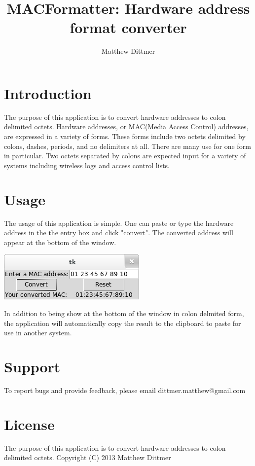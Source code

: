 \documentclass[10pt,a4paper]{article}
\author{Matthew Dittmer}
\title{MACFormatter: Hardware address format converter}
\begin{document}
\maketitle
\section*{Introduction}

The purpose of this application is to convert hardware
 addresses to colon delimited octets.  Hardware addresses, 
 or MAC(Media Access Control) addresses, are expressed in a 
 variety of forms.  These forms include two octets 
 delimited by colons, dashes, periods, and no delimiters at 
 all.  There are many use for one form in particular.  Two 
 octets separated by colons are expected input for a 
 variety of systems including wireless logs and access 
 control lists.

\section*{Usage}

The usage of this application is simple.  One can paste or 
type the hardware address in the the entry box and click 
"convert".  The converted address will appear at the bottom 
of the window.

\includegraphics[scale=.5]{screenshot0.png}

In addition to being show at the bottom of the window in 
colon delmited form, the application will automatically 
copy the result to the clipboard to paste for use in 
another system.

\section*{Support}

To report bugs and provide feedback, please email 
dittmer.matthew@gmail.com

\section*{License}

The purpose of this application is to convert hardware 
addresses to colon delimited octets.
Copyright (C) 2013  Matthew Dittmer
\end{document}
